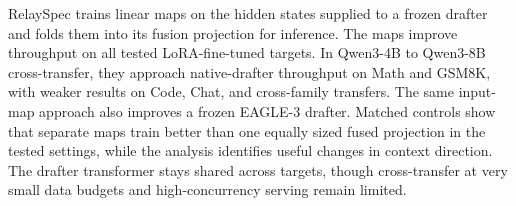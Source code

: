 RelaySpec trains linear maps on the hidden states supplied to a frozen drafter and folds them into its fusion projection for inference. The maps improve throughput on all tested LoRA-fine-tuned targets. In Qwen3-4B to Qwen3-8B cross-transfer, they approach native-drafter throughput on Math and GSM8K, with weaker results on Code, Chat, and cross-family transfers. The same input-map approach also improves a frozen EAGLE-3 drafter. Matched controls show that separate maps train better than one equally sized fused projection in the tested settings, while the analysis identifies useful changes in context direction. The drafter transformer stays shared across targets, though cross-transfer at very small data budgets and high-concurrency serving remain limited.
